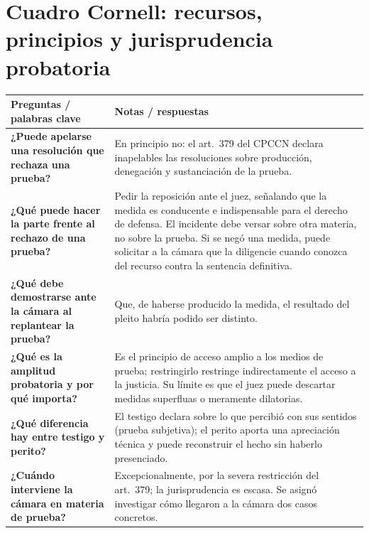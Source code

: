 \documentclass[12pt,oneside]{book}
\begin{document}
\section*{Cuadro Cornell: recursos, principios y jurisprudencia probatoria}

\begin{longtable}{
    >{\raggedright\arraybackslash}p{}
    >{\raggedright\arraybackslash}p{}
}
\toprule
\textbf{Preguntas / palabras clave} &
\textbf{Notas / respuestas} \\
\midrule
\endhead

\textbf{¿Puede apelarse una resolución que rechaza una prueba?} &
En principio no: el art.\ 379 del CPCCN declara inapelables las resoluciones sobre producción, denegación y sustanciación de la prueba. \\

\textbf{¿Qué puede hacer la parte frente al rechazo de una prueba?} &
Pedir la reposición ante el juez, señalando que la medida es conducente e indispensable para el derecho de defensa. El incidente debe versar sobre otra materia, no sobre la prueba. Si se negó una medida, puede solicitar a la cámara que la diligencie cuando conozca del recurso contra la sentencia definitiva. \\

\textbf{¿Qué debe demostrarse ante la cámara al replantear la prueba?} &
Que, de haberse producido la medida, el resultado del pleito habría podido ser distinto. \\

\textbf{¿Qué es la amplitud probatoria y por qué importa?} &
Es el principio de acceso amplio a los medios de prueba; restringirlo restringe indirectamente el acceso a la justicia. Su límite es que el juez puede descartar medidas superfluas o meramente dilatorias. \\

\textbf{¿Qué diferencia hay entre testigo y perito?} &
El testigo declara sobre lo que percibió con sus sentidos (prueba subjetiva); el perito aporta una apreciación técnica y puede reconstruir el hecho sin haberlo presenciado. \\

\textbf{¿Cuándo interviene la cámara en materia de prueba?} &
Excepcionalmente, por la severa restricción del art.\ 379; la jurisprudencia es escasa. Se asignó investigar cómo llegaron a la cámara dos casos concretos. \\


\end{longtable}
\end{document}
